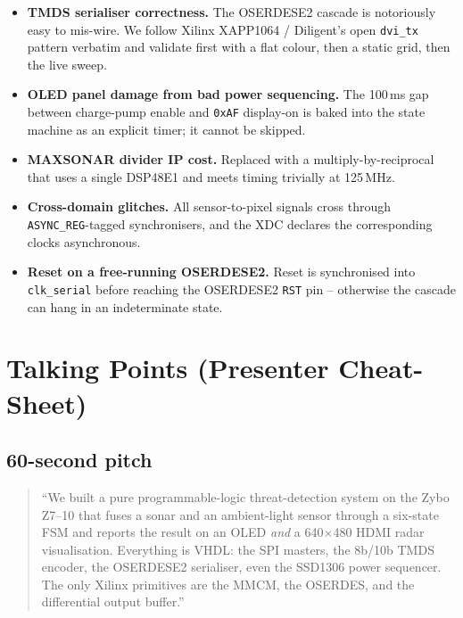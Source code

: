 \documentclass[11pt,a4paper]{article}
\begin{document}
\begin{itemize}
  \item \textbf{TMDS serialiser correctness.}  The OSERDESE2 cascade is
        notoriously easy to mis-wire.  We follow Xilinx XAPP1064 /
        Diligent's open \texttt{dvi\_tx} pattern verbatim and
        validate first with a flat colour, then a static grid, then
        the live sweep.
  \item \textbf{OLED panel damage from bad power sequencing.}  The 100\,ms
        gap between charge-pump enable and \texttt{0xAF} display-on is
        baked into the state machine as an explicit timer; it cannot
        be skipped.
  \item \textbf{MAXSONAR divider IP cost.}  Replaced with a
        multiply-by-reciprocal that uses a single DSP48E1 and meets
        timing trivially at 125\,MHz.
  \item \textbf{Cross-domain glitches.}  All sensor-to-pixel signals
        cross through \texttt{ASYNC\_REG}-tagged synchronisers, and the
        XDC declares the corresponding clocks asynchronous.
  \item \textbf{Reset on a free-running OSERDESE2.}  Reset is
        synchronised into \texttt{clk\_serial} before reaching the
        OSERDESE2 \texttt{RST} pin -- otherwise the
        cascade can hang in an indeterminate state.
\end{itemize}

\section{Talking Points (Presenter Cheat-Sheet)}

\subsection*{60-second pitch}

\begin{quote}
``We built a pure programmable-logic threat-detection system on the
Zybo Z7--10 that fuses a sonar and an ambient-light sensor through a
six-state FSM and reports the result on an OLED \emph{and} a 640$\times$480
HDMI radar visualisation.  Everything is VHDL: the SPI masters, the
8b/10b TMDS encoder, the OSERDESE2 serialiser, even the SSD1306 power
sequencer.  The only Xilinx primitives are the MMCM, the OSERDES, and
the differential output buffer.''
\end{quote}
\end{document}
